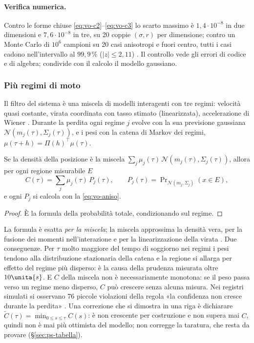 \paragraph{Verifica numerica.} Contro le forme chiuse \eqref{eq:vo-c2}--\eqref{eq:vo-c3} lo scarto massimo è $1{,}4\cdot10^{-8}$ in due dimensioni e $7{,}6\cdot10^{-8}$ in tre, su 20 coppie $(\sigma,r)$ per dimensione; contro un Monte Carlo di $10^6$ campioni su 20 casi anisotropi e fuori centro, tutti i casi cadono nell'intervallo al $99{,}9\,\%$ ($|z|\le2{,}11$) . Il controllo vede gli errori di codice e di algebra; condivide con il calcolo il modello gaussiano.

\subsubsection{Più regimi di moto}\label{sec:vo-c-imm}

Il filtro del sistema è una miscela di modelli interagenti \cite{blom1988,mazor1998,barshalom2001} con tre regimi: velocità quasi costante, virata coordinata con tasso stimato (linearizzata), accelerazione di Wiener \cite{li2003}. Durante la perdita ogni regime $j$ evolve con la sua previsione gaussiana $\mathcal N(m_j(\tau),\Sigma_j(\tau))$, e i pesi con la catena di Markov dei regimi, $\mu(\tau+h)=\Pi(h)^\top\mu(\tau)$.

\begin{proposizione}\label{prop:vo-imm}
Se la densità della posizione è la miscela $\sum_j\mu_j(\tau)\,\mathcal N(m_j(\tau),\Sigma_j(\tau))$, allora per ogni regione misurabile $E$
\[C(\tau)=\sum_j\mu_j(\tau)\,P_j(\tau),\qquad P_j(\tau)=\Pr\nolimits_{\mathcal N(m_j,\Sigma_j)}(x\in E),\]
e ogni $P_j$ si calcola con la \eqref{eq:vo-aniso}.
\end{proposizione}
\begin{proof}
È la formula della probabilità totale, condizionando sul regime.
\end{proof}
La formula è esatta \emph{per la miscela}; la miscela approssima la densità vera, per la fusione dei momenti nell'interazione e per la linearizzazione della virata . Due conseguenze. Per $\tau$ molto maggiore del tempo di soggiorno nei regimi i pesi tendono alla distribuzione stazionaria della catena e la regione si allarga per effetto del regime più disperso: è la causa della prudenza misurata oltre $10\unita{s}$. E $C$ della miscela non è necessariamente monotona: se il peso passa verso un regime meno disperso, $C$ può crescere senza alcuna misura. Nei registri simulati si osservano 76 piccole violazioni della regola «la confidenza non cresce durante la perdita» . Una correzione che si dimostra in una riga è dichiarare $\tilde C(\tau)=\min_{0\le s\le\tau}C(s)$: è non crescente per costruzione e non supera mai $C$, quindi non è mai più ottimista del modello; non corregge la taratura, che resta da provare (\S\ref{sec:ps-tabella}).

